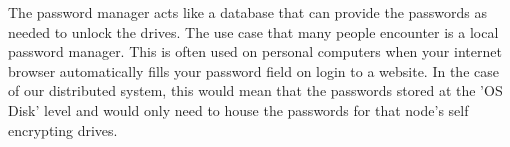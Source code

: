 \documentclass[11pt]{article} %
\def\pm{password manager\xspace}
\def\lpm{local \pm}
\def\sed{self encrypting drive\xspace}
\def\seds{\sed{s}\xspace}
\begin{document}
The \pm acts like a database that can provide the passwords as needed to unlock the drives. The use case that many people encounter is a \lpm. This is often used on personal computers when your internet browser automatically fills your password field on login to a website. In the case of our distributed system, this would mean that the passwords stored at the 'OS Disk' level and would only need to house the passwords for that node's \seds.

\begin{center}
\end{center}
\end{document}
